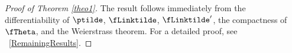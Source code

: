 
\proofskip
\begin{proof}[Proof of Theorem \ref{theo1}]
The result follows immediately from the differentiability of  $\ptilde$, $\fLinktilde$, $\fLinktilde'$, the compactness of $\fTheta$, and the Weierstrass theorem.
For a detailed proof, see \SupplementaryAppendix\ \ref{RemainingResults}.
\end{proof}





